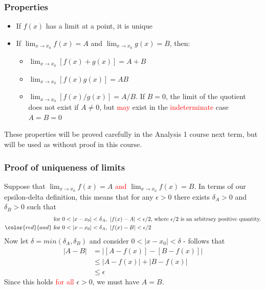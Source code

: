 \hypertarget{properties}{%
\subsubsection{Properties}\label{properties}}

\begin{itemize}
\tightlist
\item
  If \(f(x)\) has a limit at a point, it is unique
\item
  If \(\lim_{x \to x_0} f(x) = A\) and \(\lim_{x \to x_0} g(x) = B\), then:

  \begin{itemize}
  \tightlist
  \item
    \(\lim_{x \to x_0} [f(x) + g(x)] = A + B\)\\
  \item
    \(\lim_{x \to x_0} [f(x)g(x)] = AB\)\\
  \item
    \(\lim_{x \to x_0} [f(x) / g(x)] = A / B\). If \(B = 0\), the limit of the quotient does not exist if \(A \neq 0\), but \textcolor{red}{may} exist in the \textcolor{red}{indeterminate} case \(A = B = 0\)
  \end{itemize}
\end{itemize}

These properties will be proved carefully in the Analysis 1 course next term, but will be used as without proof in this course.

\hypertarget{proof-of-uniqueness-of-limits}{%
\subsubsection{Proof of uniqueness of limits}\label{proof-of-uniqueness-of-limits}}

Suppose that \(\lim_{x \to x_0} f(x) = A\) \textcolor{red}{and} \(\lim_{x \to x_0} f(x) = B\).
In terms of our epsilon-delta definition, this means that for any \(\epsilon > 0\) there exists \(\delta_A > 0\) and \(\delta_B > 0\) such that
\begin{align*}
  &\text{for }0 < |x -x_0| < \delta_A,\ |f(x) - A| < \epsilon / 2 \text{, where } \epsilon / 2 \text{ is an arbitrary positive quantity.} \\
  \color{red}{and} \ &\text{for } 0 < |x -x_0| < \delta_A,\ |f(x) - B| < \epsilon / 2
\end{align*}
Now let \(\delta = min(\delta_A, \delta_B)\) and consider \(0 < |x -x_0| < \delta\) - follows that
\begin{align*}
  |A - B| &= |[A - f(x)] - [B - f(x)]| \\
  &\leq |A - f(x)| + |B - f(x)| \\
  &\leq \epsilon
\end{align*}
Since this holds \textcolor{red}{for all} \(\epsilon > 0\), we must have \(A = B\).